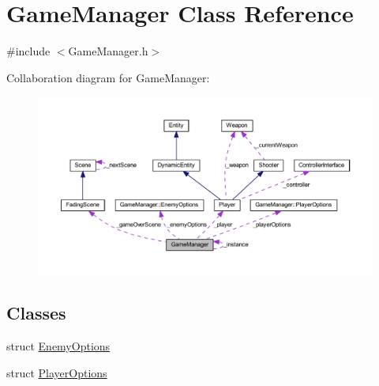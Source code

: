 \hypertarget{class_game_manager}{
\section{GameManager Class Reference}
\label{db/d10/class_game_manager}
}


{\ttfamily \#include $<$GameManager.h$>$}



Collaboration diagram for GameManager:
\nopagebreak
\begin{figure}[H]
\begin{center}
\leavevmode
\includegraphics[width=400pt]{da/d7e/class_game_manager__coll__graph}
\end{center}
\end{figure}
\subsection*{Classes}
\begin{DoxyCompactItemize}
\item 
struct \hyperlink{struct_game_manager_1_1_enemy_options}{EnemyOptions}
\item 
struct \hyperlink{struct_game_manager_1_1_player_options}{PlayerOptions}
\end{DoxyCompactItemize}
